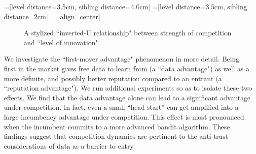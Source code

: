 \documentclass[../competing_bandits_with_appendix.tex]{subfiles}
\begin{document}
=[level distance=3.5cm, sibling distance=4.0cm]
=[level distance=3.5cm, sibling distance=2cm]
 = [align=center]

\begin{figure}[t]
\begin{center}
 \caption{A stylized ``inverted-U relationship" between strength of competition and ``level of innovation".}
\label{fig:inverted-U}
\end{center}
\end{figure}

We investigate the ``first-mover advantage" phenomenon in more detail. Being first in the market gives free data to learn from (a ``data advantage") as well as a more definite, and possibly better reputation compared to an entrant (a ``reputation advantage"). We run additional experiments so as to isolate these two effects. We find that the data advantage alone can lead to a significant advantage under competition. In fact, even a small ``head start'' can get amplified into a large incumbency advantage under competition. This effect is most pronounced when the incumbent commits to a more advanced bandit algorithm. These findings suggest that competition dynamics are pertinent to the anti-trust considerations of data as a barrier to entry.
\end{document}
